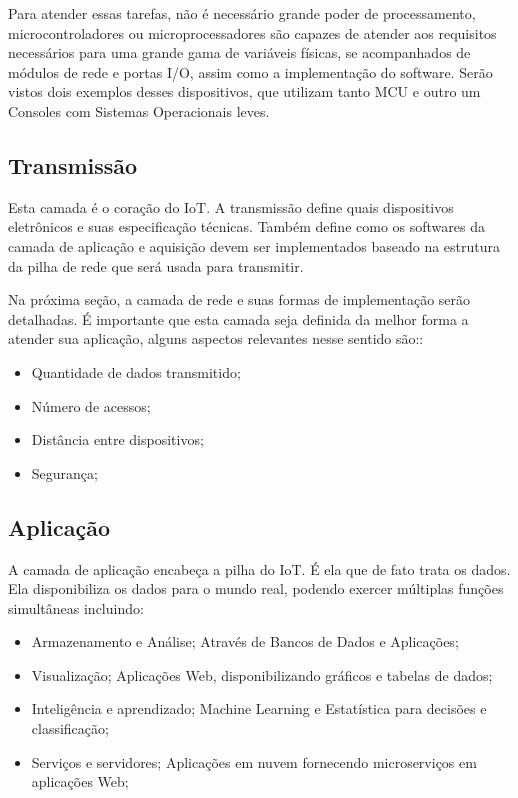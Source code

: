 Para atender essas tarefas, não é necessário grande poder de processamento, microcontroladores ou microprocessadores são capazes de atender aos requisitos necessários para uma grande gama de variáveis físicas, se acompanhados de módulos de rede e portas I/O, assim como a implementação do software. Serão vistos dois exemplos desses dispositivos, que utilizam tanto MCU  e outro um Consoles com Sistemas Operacionais leves.
 

\subsection{Transmissão}
\label{subsection:transmicao}

Esta camada é o coração do IoT. A transmissão define quais dispositivos eletrônicos e suas especificação técnicas. Também define como os softwares da camada de aplicação e aquisição devem ser implementados baseado na estrutura da pilha de rede que será usada para transmitir.

Na próxima seção, a camada de rede e suas formas de implementação serão detalhadas. É importante que esta camada seja definida da melhor forma a atender sua aplicação, alguns aspectos relevantes nesse sentido são:: 
\begin{itemize}
\item Quantidade de dados transmitido;
\item Número de acessos; 
\item Distância entre dispositivos;
\item Segurança;
\end{itemize}

\subsection{Aplicação}
\label{subsection:aplicacao}

A camada de aplicação encabeça a pilha do IoT. É ela que de fato trata os dados. Ela disponibiliza os dados para o mundo real, podendo exercer múltiplas funções simultâneas incluindo:

\begin{itemize}
\item Armazenamento e Análise; Através de Bancos de Dados e Aplicações;
\item Visualização; Aplicações Web, disponibilizando gráficos e tabelas de dados;
\item Inteligência e aprendizado; Machine Learning e Estatística para decisões e classificação;
\item Serviços e servidores; Aplicações em nuvem fornecendo microserviços em aplicações Web;
\end{itemize}

